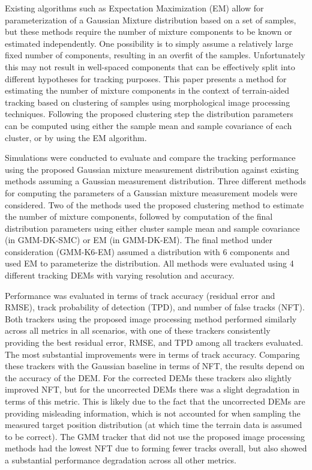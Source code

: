\documentclass[journal]{IEEEtran}
\begin{document}
Existing algorithms such as Expectation Maximization (EM) allow for parameterization of a Gaussian Mixture distribution based on a set of samples, but these methods require the number of mixture components to be known or estimated independently. One possibility is to simply assume a relatively large fixed number of components, resulting in an overfit of the samples. Unfortunately this may not result in well-spaced components that can be effectively split into different hypotheses for tracking purposes. This paper presents a method for estimating the number of mixture components in the context of terrain-aided tracking based on clustering of samples using morphological image processing techniques. Following the proposed clustering step the distribution parameters can be computed using either the sample mean and sample covariance of each cluster, or by using the EM algorithm.

Simulations were conducted to evaluate and compare the tracking performance using the proposed Gaussian mixture measurement distribution against existing methods assuming a Gaussian measurement distribution. Three different methods for computing the parameters of a Gaussian mixture measurement models were considered. Two of the methods used the proposed clustering method to estimate the number of mixture components, followed by computation of the final distribution parameters using either cluster sample mean and sample covariance (in GMM-DK-SMC) or EM (in GMM-DK-EM). The final method under consideration (GMM-K6-EM) assumed a distribution with 6 components and used EM to parameterize the distribution. All methods were evaluated using 4 different tracking DEMs with varying resolution and accuracy.

Performance was evaluated in terms of track accuracy (residual error and RMSE), track probability of detection (TPD), and number of false tracks (NFT). Both trackers using the proposed image processing method performed similarly across all metrics in all scenarios, with one of these trackers consistently providing the best residual error, RMSE, and TPD among all trackers evaluated. The most substantial improvements were in terms of track accuracy. Comparing these trackers with the Gaussian baseline in terms of NFT, the results depend on the accuracy of the DEM. For the corrected DEMs these trackers also slightly improved NFT, but for the uncorrected DEMs there was a slight degradation in terms of this metric. This is likely due to the fact that the uncorrected DEMs are providing misleading information, which is not accounted for when sampling the measured target position distribution (at which time the terrain data is assumed to be correct). The GMM tracker that did not use the proposed image processing methods had the lowest NFT due to forming fewer tracks overall, but also showed a substantial performance degradation across all other metrics.
\end{document}
